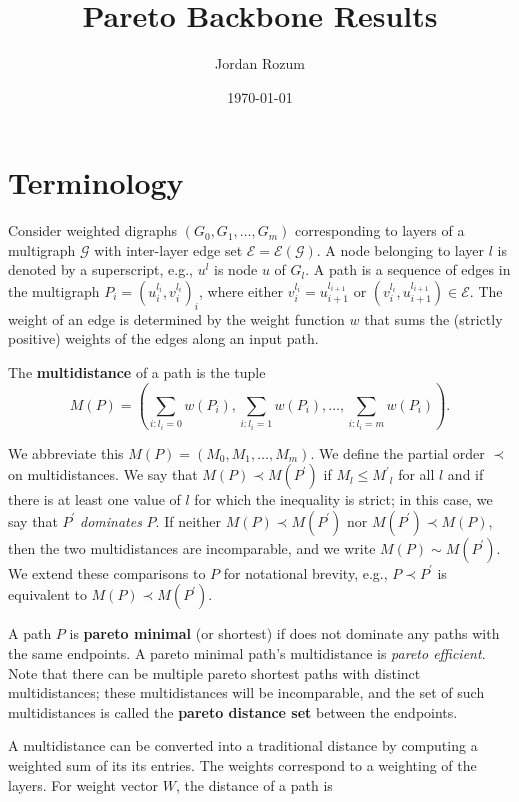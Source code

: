 \documentclass{article}
\title{Pareto Backbone Results}
\author{Jordan Rozum}
\date{\today} %
\begin{document}
\maketitle %

\section{Terminology} %

Consider weighted digraphs $\left(G_0,G_1,\ldots,G_m\right)$ corresponding
to layers of a multigraph $\mathcal{G}$ with inter-layer edge set 
$\mathcal{E}=\mathcal{E}(\mathcal{G})$. 
A node belonging to layer $l$ is denoted by a superscript, e.g., $u^l$ is
node $u$ of $G_l$. A path is a sequence of edges in the multigraph 
$P_i={(u_i^{l_i},v_i^{l_i})}_i$, where either 
$v_i^{l_i}=u_{i+1}^{l_{i+1}}$ or $(v_i^{l_i},u_{i+1}^{l_{i+1}})\in\mathcal{E}$. 
The weight of an edge is determined by the weight function $w$ that sums the
(strictly positive) weights of the edges along an input path.

The {\bf multidistance} of a path is the tuple
\[M(P)=\left(\sum_{i:l_i=0} w(P_i),\sum_{i:l_i=1} w(P_i),\ldots,\sum_{i:l_i=m} w(P_i)\right).\]

We abbreviate this $M(P)=(M_0,M_1,\ldots,M_m)$. We define the partial order $\prec$
on multidistances. We say that $M(P)\prec M(P^\prime)$ if $M_l\leq {M^\prime}_l$ for all $l$ and if
there is at least one value of $l$ for which the inequality is strict; in this case, we say that
$P^\prime$ \emph{dominates} $P$. If neither
$M(P)\prec M(P^\prime)$ nor $M(P^\prime)\prec M(P)$, then the two multidistances are incomparable, and
we write $M(P)\sim M(P^\prime)$. We extend these comparisons to $P$ for notational brevity, e.g.,
$P\prec P^\prime$ is equivalent to $M(P)\prec M(P^\prime)$.

A path $P$ is {\bf pareto minimal} (or shortest) if does not dominate any paths with the same
endpoints. A pareto minimal path's multidistance is \emph{pareto efficient}. Note that there can be
multiple pareto shortest paths with distinct multidistances; these
multidistances will be incomparable, and the set of such multidistances is called the 
{\bf pareto distance set} between the endpoints.

A multidistance can be converted into a traditional distance by computing a weighted sum of its
its entries. The weights correspond to a weighting of the layers. For weight vector $W$,
the distance of a path is
\end{document}
